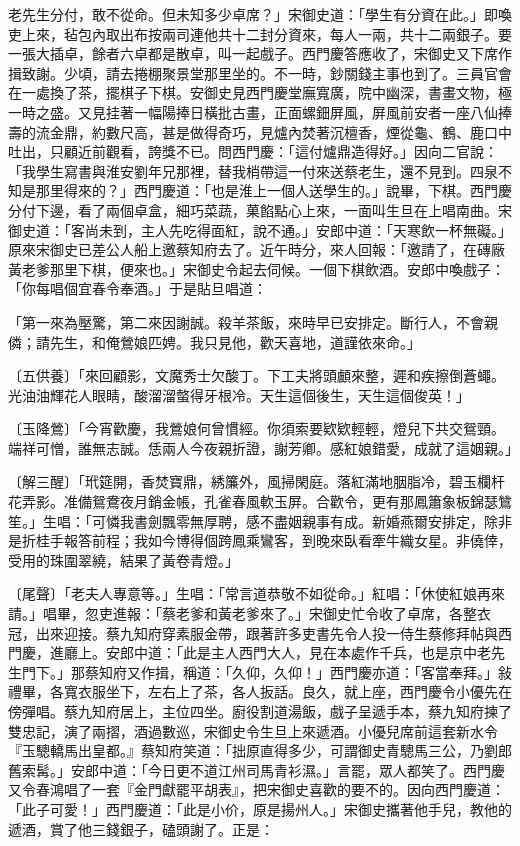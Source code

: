 \begin{showcontents}{}
老先生分付，敢不從命。但未知多少卓席？」宋御史道：「學生有分資在此。」即喚吏上來，毡包內取出布按兩司連他共十二封分資來，每人一兩，共十二兩銀子。要一張大插卓，餘者六卓都是散卓，叫一起戲子。西門慶答應收了，宋御史又下席作揖致謝。少頃，請去捲棚聚景堂那里坐的。不一時，鈔關錢主事也到了。三員官會在一處換了茶，擺棋子下棋。安御史見西門慶堂廡寬廣，院中幽深，書畫文物，極一時之盛。又見挂著一幅陽捧日橫批古畫，正面螺鈿屏風，屏風前安者一座八仙捧壽的流金鼎，約數尺高，甚是做得奇巧，見爐內焚著沉檀香，煙從龜、鶴、鹿口中吐出，只顧近前觀看，誇獎不已。問西門慶：「這付爐鼎造得好。」因向二官說：「我學生寫書與淮安劉年兄那裡，替我梢帶這一付來送蔡老生，還不見到。四泉不知是那里得來的？」西門慶道：「也是淮上一個人送學生的。」說畢，下棋。西門慶分付下邊，看了兩個卓盒，細巧菜蔬，菓餡點心上來，一面叫生旦在上唱南曲。宋御史道：「客尚未到，主人先吃得面紅，說不通。」安郎中道：「天寒飲一杯無礙。」原來宋御史已差公人船上邀蔡知府去了。近午時分，來人回報：「邀請了，在磚廠黃老爹那里下棋，便來也。」宋御史令起去伺候。一個下棋飲酒。安郎中喚戲子：「你每唱個宜春令奉酒。」于是貼旦唱道：

「第一來為壓驚，第二來因謝誠。殺羊茶飯，來時早已安排定。斷行人，不會親僯；請先生，和俺鶯娘匹娉。我只見他，歡天喜地，道謹依來命。」

〔五供養〕「來回顧影，文魔秀士欠酸丁。下工夫將頭顱來整，遲和疾擦倒蒼蠅。光油油輝花人眼睛，酸溜溜螫得牙根冷。天生這個後生，天生這個俊英！」

〔玉降鶯〕「今宵歡慶，我鶯娘何曾慣經。你須索要欵欵輕輕，燈兒下共交鴛頸。端祥可憎，誰無志誠。恁兩人今夜親折證，謝芳卿。感紅娘錯愛，成就了這姻親。」

〔解三醒〕「玳筵開，香焚寶鼎，綉簾外，風掃閑庭。落紅滿地胭脂冷，碧玉欄杆花弄影。准備鴛鴦夜月銷金帳，孔雀春風軟玉屏。合歡令，更有那鳳簫象板錦瑟鷥笙。」生唱：「可憐我書劍飄零無厚聘，感不盡姻親事有成。新婚燕爾安排定，除非是折桂手報答前程；我如今博得個跨鳳乘鸞客，到晚來臥看牽牛織女星。非僥倖，受用的珠圍翠繞，結果了黃卷青燈。」

〔尾聲〕「老夫人專意等。」生唱：「常言道恭敬不如從命。」紅唱：「休使紅娘再來請。」唱畢，忽吏進報：「蔡老爹和黃老爹來了。」宋御史忙令收了卓席，各整衣冠，出來迎接。蔡九知府穿素服金帶，跟著許多吏書先令人投一侍生蔡修拜帖與西門慶，進廳上。安郎中道：「此是主人西門大人，見在本處作千兵，也是京中老先生門下。」那蔡知府又作揖，稱道：「久仰，久仰！」西門慶亦道：「客當奉拜。」敍禮畢，各寬衣服坐下，左右上了茶，各人扳話。良久，就上座，西門慶令小優先在傍彈唱。蔡九知府居上，主位四坐。廚役割道湯飯，戲子呈遞手本，蔡九知府揀了雙忠記，演了兩摺，酒過數巡，宋御史令生旦上來遞酒。小優兒席前這套新水令『玉驄轎馬出皇都。』蔡知府笑道：「拙原直得多少，可謂御史青驄馬三公，乃劉郎舊索髯。」安郎中道：「今日更不道江州司馬青衫濕。」言罷，眾人都笑了。西門慶又令春鴻唱了一套『金門獻罷平胡表』，把宋御史喜歡的要不的。因向西門慶道：「此子可愛！」西門慶道：「此是小价，原是揚州人。」宋御史攜著他手兒，教他的遞酒，賞了他三錢銀子，磕頭謝了。正是：


\end{showcontents}

